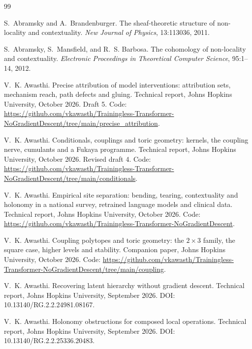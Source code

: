 \documentclass[11pt]{article}
\theoremstyle{definition}
\theoremstyle{remark}
\begin{document}
\begin{thebibliography}{99}

S.~Abramsky and A.~Brandenburger.
\newblock The sheaf-theoretic structure of non-locality and contextuality.
\newblock \emph{New Journal of Physics}, 13:113036, 2011.

S.~Abramsky, S.~Mansfield, and R.~S. Barbosa.
\newblock The cohomology of non-locality and contextuality.
\newblock \emph{Electronic Proceedings in Theoretical Computer Science}, 95:1--14, 2012.

V.~K. Awasthi.
\newblock Precise attribution of model interventions: attribution sets, mechanism reach, path defects
and gluing.
\newblock Technical report, Johns Hopkins University, October 2026. Draft 5. Code: \url{https://github.com/vkawasth/Trainingless-Transformer-NoGradientDescent/tree/main/precise_attribution}.

V.~K. Awasthi.
\newblock Conditionals, couplings and toric geometry: kernels, the coupling nerve, cumulants and a {F}ukaya
programme.
\newblock Technical report, Johns Hopkins University, October 2026. Revised draft 4. Code: \url{https://github.com/vkawasth/Trainingless-Transformer-NoGradientDescent/tree/main/conditionals}.

V.~K. Awasthi.
\newblock Empirical site separation: bending, tearing, contextuality and holonomy in a national survey, retrained language models and clinical data.
\newblock Technical report, Johns Hopkins University, October 2026. Code: \url{https://github.com/vkawasth/Trainingless-Transformer-NoGradientDescent}.

V.~K. Awasthi.
\newblock Coupling polytopes and toric geometry: the $2\times3$ family, the square case, higher levels and stability.
\newblock Companion paper, Johns Hopkins University, October 2026. Code: \url{https://github.com/vkawasth/Trainingless-Transformer-NoGradientDescent/tree/main/coupling}.

V.~K. Awasthi.
\newblock Recovering latent hierarchy without gradient descent.
\newblock Technical report, Johns Hopkins University, September 2026.
\newblock DOI: 10.13140/RG.2.2.24981.08167.

V.~K. Awasthi.
\newblock Holonomy obstructions for composed local operations.
\newblock Technical report, Johns Hopkins University, September 2026.
\newblock DOI: 10.13140/RG.2.2.25336.20483.


\end{thebibliography}
\end{document}
